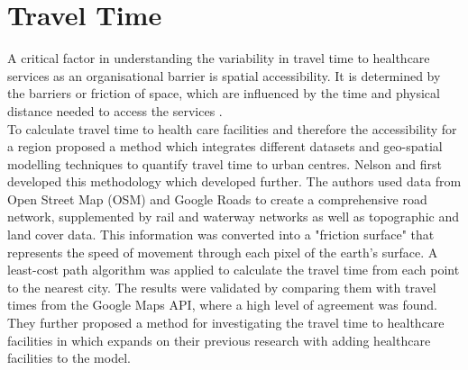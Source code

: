 \documentclass[11pt, a4paper]{report}
\begin{document}
\section{Travel Time}\label{sec:introtraveltime}
A critical factor in understanding the variability in travel time to healthcare services as an organisational barrier is spatial accessibility. It is determined by the barriers or friction of space, which are influenced by the time and physical distance needed to access the services  \citet{aday_framework_1974}. \\
%
To calculate travel time to health care facilities and therefore the accessibility for a region \citet{weiss_global_2018} proposed a method which integrates different datasets and geo-spatial modelling techniques to quantify travel time to urban centres. Nelson \citet{nelson_suite_2019} and \citet{european_commission_joint_research_centre_global_2021} first developed this methodology which \citet{weiss_global_2018} developed further. The authors used data from Open Street Map (OSM) and Google Roads to create a comprehensive road network, supplemented by rail and waterway networks as well as topographic and land cover data. This information was converted into a "friction surface" that represents the speed of movement through each pixel of the earth's surface. A least-cost path algorithm was applied to calculate the travel time from each point to the nearest city. The results were validated by comparing them with travel times from the Google Maps API, where a high level of agreement was found. They further proposed a method for investigating the travel time to healthcare facilities in \citet{weiss_global_2020} which expands on their previous research with adding healthcare facilities to the model.
\end{document}

